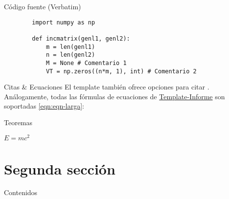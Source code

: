 
\begin{frame}[fragile]{Código fuente (Verbatim)}
	\begin{example}
		\begin{verbatim}
		import numpy as np
		
		def incmatrix(genl1, genl2):
			m = len(genl1)
			n = len(genl2)
			M = None # Comentario 1
			VT = np.zeros((n*m, 1), int) # Comentario 2
		\end{verbatim}
	\end{example}
\end{frame}


\begin{frame}{Citas \& Ecuaciones}
	El template también ofrece opciones para citar \cite{template}. Análogamente, todas las fórmulas de ecuaciones de \href{https://latex.ppizarror.com/informe}{Template-Informe} son soportadas \eqref{eqn:eqn-larga}:
	
\end{frame}


\begin{frame}{Teoremas}
	\begin{theorem}
		$E = mc^2$
	\end{theorem}
\end{frame}


\section{Segunda sección}

\begin{frame}{Contenidos}
	\tableofcontentscurrent
\end{frame}

